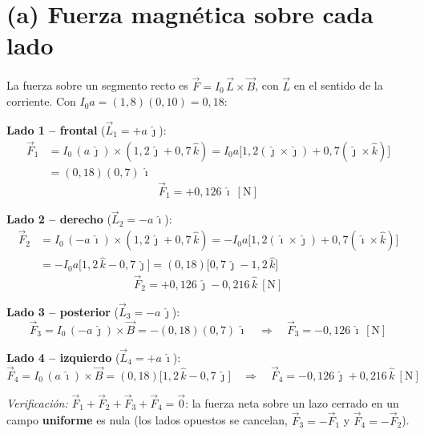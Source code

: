 \documentclass[12pt,letterpaper]{article}
\begin{document}
\medskip

\section*{(a) Fuerza magn\'etica sobre cada lado}

La fuerza sobre un segmento recto es $\vec{F}=I_0\,\vec{L}\times\vec{B}$, con $\vec{L}$ en el
sentido de la corriente. Con $I_0 a = (1{,}8)(0{,}10)=0{,}18$:

\medskip
\noindent\textbf{Lado 1 -- frontal} ($\vec{L}_1=+a\,\hat{\jmath}$):
\begin{align*}
    \vec{F}_1 &= I_0\,(a\,\hat{\jmath})\times(1{,}2\,\hat{\jmath}+0{,}7\,\hat{k})
             = I_0 a\big[1{,}2(\hat{\jmath}\times\hat{\jmath})+0{,}7(\hat{\jmath}\times\hat{k})\big]\\
             &= (0{,}18)(0{,}7)\,\hat{\imath}
\end{align*}
\[
    \boxed{\vec{F}_1 = +0{,}126\,\hat{\imath}\ [\text{N}]}
\]

\noindent\textbf{Lado 2 -- derecho} ($\vec{L}_2=-a\,\hat{\imath}$):
\begin{align*}
    \vec{F}_2 &= I_0\,(-a\,\hat{\imath})\times(1{,}2\,\hat{\jmath}+0{,}7\,\hat{k})
             = -I_0 a\big[1{,}2(\hat{\imath}\times\hat{\jmath})+0{,}7(\hat{\imath}\times\hat{k})\big]\\
             &= -I_0 a\big[1{,}2\,\hat{k}-0{,}7\,\hat{\jmath}\big]
              = (0{,}18)\big[0{,}7\,\hat{\jmath}-1{,}2\,\hat{k}\big]
\end{align*}
\[
    \boxed{\vec{F}_2 = +0{,}126\,\hat{\jmath}-0{,}216\,\hat{k}\ [\text{N}]}
\]

\noindent\textbf{Lado 3 -- posterior} ($\vec{L}_3=-a\,\hat{\jmath}$):
\[
    \vec{F}_3 = I_0\,(-a\,\hat{\jmath})\times\vec{B} = -(0{,}18)(0{,}7)\,\hat{\imath}
    \quad\Rightarrow\quad
    \boxed{\vec{F}_3 = -0{,}126\,\hat{\imath}\ [\text{N}]}
\]

\noindent\textbf{Lado 4 -- izquierdo} ($\vec{L}_4=+a\,\hat{\imath}$):
\[
    \vec{F}_4 = I_0\,(a\,\hat{\imath})\times\vec{B} = (0{,}18)\big[1{,}2\,\hat{k}-0{,}7\,\hat{\jmath}\big]
    \quad\Rightarrow\quad
    \boxed{\vec{F}_4 = -0{,}126\,\hat{\jmath}+0{,}216\,\hat{k}\ [\text{N}]}
\]

\noindent\textit{Verificaci\'on:} $\vec{F}_1+\vec{F}_2+\vec{F}_3+\vec{F}_4=\vec{0}$: la fuerza
neta sobre un lazo cerrado en un campo \textbf{uniforme} es nula (los lados opuestos se cancelan,
$\vec{F}_3=-\vec{F}_1$ y $\vec{F}_4=-\vec{F}_2$). \checkmark
\end{document}
